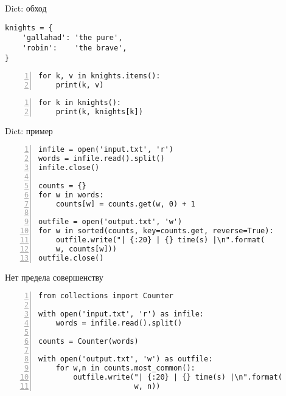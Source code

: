 \documentclass[hyperref={pdftex,unicode}]{beamer}
\begin{document}
\begin{frame}[fragile]{Dict: обход}
  \begin{lstlisting}[basicstyle=\footnotesize\ttfamily,numbers=none]
knights = {
    'gallahad': 'the pure',
    'robin':    'the brave',
}
  \end{lstlisting}
  \begin{minipage}{0.55\linewidth}
    \begin{lstlisting}[basicstyle=\footnotesize\ttfamily,numbers=left]
for k, v in knights.items():
    print(k, v)
    \end{lstlisting}
  \end{minipage}
  \hfill
  \begin{minipage}{0.43\linewidth}
    \begin{lstlisting}[basicstyle=\footnotesize\ttfamily,numbers=left]
for k in knights():
    print(k, knights[k])
    \end{lstlisting}
  \end{minipage}
\end{frame}

\begin{frame}[fragile]{Dict: пример}
\begin{lstlisting}[basicstyle=\footnotesize\ttfamily,numbers=left]
infile = open('input.txt', 'r')
words = infile.read().split()
infile.close()

counts = {}
for w in words:
    counts[w] = counts.get(w, 0) + 1

outfile = open('output.txt', 'w')
for w in sorted(counts, key=counts.get, reverse=True):
    outfile.write("| {:20} | {} time(s) |\n".format(
    w, counts[w]))
outfile.close()
\end{lstlisting}
\end{frame}

\begin{frame}[fragile]{Нет предела совершенству}
\begin{lstlisting}[basicstyle=\footnotesize\ttfamily,numbers=left]
from collections import Counter

with open('input.txt', 'r') as infile:
    words = infile.read().split()

counts = Counter(words)

with open('output.txt', 'w') as outfile:
    for w,n in counts.most_common():
        outfile.write("| {:20} | {} time(s) |\n".format(
                      w, n))
\end{lstlisting}
\end{frame}
\end{document}
